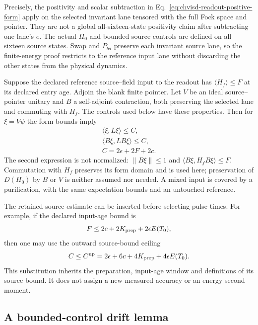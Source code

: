 Precisely, the positivity and scalar subtraction in
Eq.~\eqref{eq:chvisd-readout-positive-form} apply on the selected invariant
lane tensored with the full Fock space and pointer. They are not a global
all-sixteen-state positivity claim after subtracting one lane's $e$.
The actual $H_0$ and bounded source controls are defined on all sixteen
source states. Swap and $P_{ba}$ preserve each invariant source lane, so
the finite-energy proof restricts to the reference input lane without
discarding the other states from the physical dynamics.

Suppose the declared reference source--field input to the readout has
$\langle H_f\rangle\leq F$ at its declared entry age. Adjoin the blank
finite pointer. Let $V$ be an ideal source--pointer unitary and $B$ a
self-adjoint contraction, both preserving the selected lane and commuting
with $H_f$. The controls used below have these properties. Then
for $\xi=V\psi$ the form bounds imply
\begin{equation}
\begin{gathered}
\langle\xi,L\xi\rangle\leq C,\\
 \langle B\xi,L B\xi\rangle\leq C,\\
 C=2\epsilon+2F+2c.
\end{gathered}
\label{eq:chvisd-readout-common-C}
\end{equation}
The second expression is not normalized: $\|B\xi\|\leq1$ and
$\langle B\xi,H_fB\xi\rangle\leq F$. Commutation with $H_f$ preserves
its form domain and is used here; preservation of $D(H_0)$ by $B$ or $V$
is neither assumed nor needed. A mixed input is covered by a purification,
with the same expectation bounds and an untouched reference.

The retained source estimate can be inserted before selecting pulse times.
For example, if the declared input-age bound is
\begin{equation}
 F\leq2c+2K_{\rm prep}+2\epsilon E(T_0),
\end{equation}
then one may use the outward source-bound ceiling
\begin{equation}
 C\leq C^{\rm up}
   =2\epsilon+6c+4K_{\rm prep}+4\epsilon E(T_0).
 \label{eq:chvisd-readout-source-C-upper}
\end{equation}
This substitution inherits the preparation, input-age window and
definitions of its source bound. It does not assign a new measured
accuracy or an energy second moment.

\subsection{A bounded-control drift lemma}
\label{sec:chvisd-bounded-pulse-lemma}

